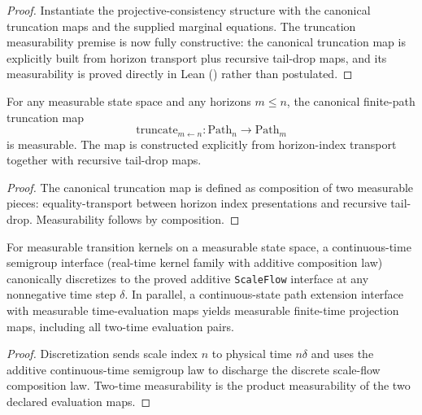 \begin{proof}
Instantiate the projective-consistency structure with the canonical truncation maps and the supplied marginal equations. The truncation measurability premise is now fully constructive: the canonical truncation map is explicitly built from horizon transport plus recursive tail-drop maps, and its measurability is proved directly in Lean () rather than postulated.
\end{proof}

\begin{theorem}\label{thm:measurable-transition-constructive-truncation}
For any measurable state space and any horizons $m\le n$, the canonical finite-path truncation map
\[
\mathrm{truncate}_{m\leftarrow n}:
\mathrm{Path}_n\to \mathrm{Path}_m
\]
is measurable. The map is constructed explicitly from horizon-index transport together with recursive tail-drop maps.
\end{theorem}

\begin{proof}
The canonical truncation map is defined as composition of two measurable pieces: equality-transport between horizon index presentations and recursive tail-drop. Measurability follows by composition.
\end{proof}

\begin{theorem}\label{thm:continuous-time-continuous-state-interface}
For measurable transition kernels on a measurable state space, a continuous-time semigroup interface (real-time kernel family with additive composition law) canonically discretizes to the proved additive \texttt{ScaleFlow} interface at any nonnegative time step $\delta$. In parallel, a continuous-state path extension interface with measurable time-evaluation maps yields measurable finite-time projection maps, including all two-time evaluation pairs.
\end{theorem}

\begin{proof}
Discretization sends scale index $n$ to physical time $n\delta$ and uses the additive continuous-time semigroup law to discharge the discrete scale-flow composition law. Two-time measurability is the product measurability of the two declared evaluation maps.
\end{proof}

